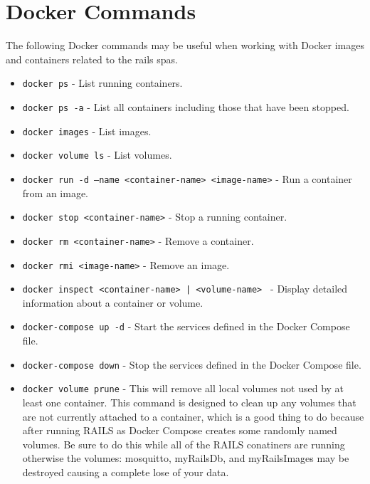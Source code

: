 \chapter{Docker Commands}
\label{app:dockercommands}
The following Docker commands may be useful when working with Docker images and containers related to the \gls{rails} \glspl{spa}.
\begin{itemize}
    \item \texttt{docker ps} - List running containers.
    \item \texttt{docker ps -a} - List all containers including those that have been stopped.
    \item \texttt{docker images} - List images.
    \item \texttt{docker volume ls} - List volumes.
    \item \texttt{docker run -d --name <container-name> <image-name>} - Run a container from an image.
    \item \texttt{docker stop <container-name>} - Stop a running container.
    \item \texttt{docker rm <container-name>} - Remove a container.
    \item \texttt{docker rmi <image-name>} - Remove an image.
    \item \texttt{docker inspect <container-name> | <volume-name> } - Display detailed information about a container or volume.
    \item \texttt{docker-compose up -d} - Start the services defined in the Docker Compose file.
    \item \texttt{docker-compose down} - Stop the services defined in the Docker Compose file.
    \item \texttt{docker volume prune} - This will remove all local volumes not used by at least one container. This command is designed to clean up any volumes that are not currently attached to a container, which is a good thing to do because after running RAILS as Docker Compose creates some randomly named volumes. Be sure to do this while all of the RAILS conatiners are running otherwise the volumes: mosquitto, myRailsDb, and myRailsImages may be destroyed causing a complete lose of your data.
\end{itemize}
